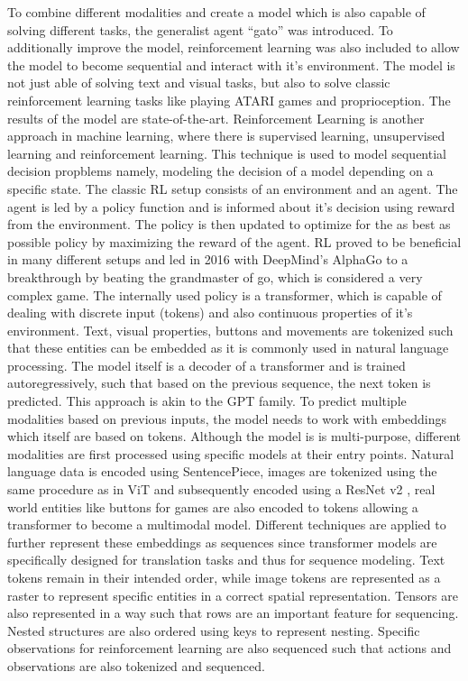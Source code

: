 \documentclass[
]{krantz}
\begin{document}
To combine different modalities and create a model which is also capable of solving different tasks, the generalist agent ``gato'' was introduced. To additionally improve the model, reinforcement learning was also included to allow the model to become sequential and interact with it's environment. The model is not just able of solving text and visual tasks, but also to solve classic reinforcement learning tasks like playing ATARI games and proprioception. The results of the model are state-of-the-art.
Reinforcement Learning is another approach in machine learning, where there is supervised learning, unsupervised learning and reinforcement learning. This technique is used to model sequential decision propblems namely, modeling the decision of a model depending on a specific state. The classic RL setup consists of an environment and an agent. The agent is led by a policy function and is informed about it's decision using reward from the environment. The policy is then updated to optimize for the as best as possible policy by maximizing the reward of the agent. RL proved to be beneficial in many different setups and led in 2016 with DeepMind's AlphaGo to a breakthrough by beating the grandmaster of go, which is considered a very complex game.
The internally used policy is a transformer, which is capable of dealing with discrete input (tokens) and also continuous properties of it's environment. Text, visual properties, buttons and movements are tokenized such that these entities can be embedded as it is commonly used in natural language processing. The model itself is a decoder of a transformer and is trained autoregressively, such that based on the previous sequence, the next token is predicted. This approach is akin to the GPT family. To predict multiple modalities based on previous inputs, the model needs to work with embeddings which itself are based on tokens. Although the model is is multi-purpose, different modalities are first processed using specific models at their entry points. Natural language data is encoded using SentencePiece, images are tokenized using the same procedure as in ViT and subsequently encoded using a ResNet v2 \citet{He2016b}, real world entities like buttons for games are also encoded to tokens allowing a transformer to become a multimodal model. Different techniques are applied to further represent these embeddings as sequences since transformer models are specifically designed for translation tasks and thus for sequence modeling. Text tokens remain in their intended order, while image tokens are represented as a raster to represent specific entities in a correct spatial representation. Tensors are also represented in a way such that rows are an important feature for sequencing. Nested structures are also ordered using keys to represent nesting. Specific observations for reinforcement learning are also sequenced such that actions and observations are also tokenized and sequenced.
\end{document}
